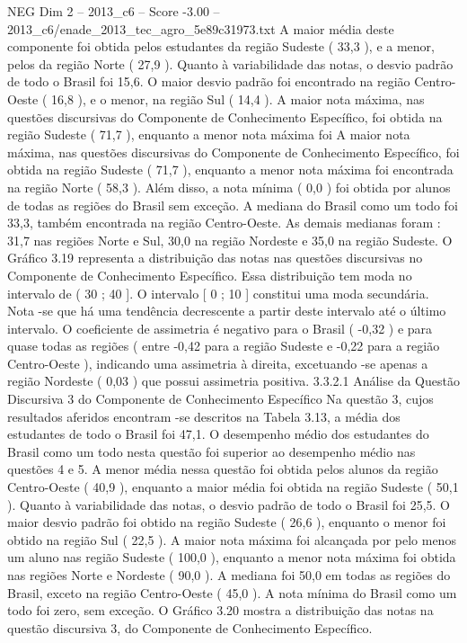 \begin{textsample}{NEG Dim 2 – 2013\_c6 – Score -3.00 – 2013\_c6/enade\_2013\_tec\_agro\_5e89c31973.txt}
A maior média deste componente foi obtida pelos estudantes da região Sudeste ( 33,3 ), e a menor, pelos da região Norte ( 27,9 ).
Quanto à variabilidade das notas, o desvio padrão de todo o Brasil foi 15,6.
O maior desvio padrão foi encontrado na região Centro-Oeste ( 16,8 ), e o menor, na região Sul ( 14,4 ).
A maior nota máxima, nas questões discursivas do Componente de Conhecimento Específico, foi obtida na região Sudeste ( 71,7 ), enquanto a menor nota máxima foi A maior nota máxima, nas questões discursivas do Componente de Conhecimento Específico, foi obtida na região Sudeste ( 71,7 ), enquanto a menor nota máxima foi encontrada na região Norte ( 58,3 ).
Além disso, a nota mínima ( 0,0 ) foi obtida por alunos de todas as regiões do Brasil sem exceção.
A mediana do Brasil como um todo foi 33,3, também encontrada na região Centro-Oeste.
As demais medianas foram : 31,7 nas regiões Norte e Sul, 30,0 na região Nordeste e 35,0 na região Sudeste.
O Gráfico 3.19 representa a distribuição das notas nas questões discursivas no Componente de Conhecimento Específico.
Essa distribuição tem moda no intervalo de ( 30 ; 40 ].
O intervalo [ 0 ; 10 ] constitui uma moda secundária.
Nota -se que há uma tendência decrescente a partir deste intervalo até o último intervalo.
O coeficiente de assimetria é negativo para o Brasil ( -0,32 ) e para quase todas as regiões ( entre -0,42 para a região Sudeste e -0,22 para a região Centro-Oeste ), indicando uma assimetria à direita, excetuando -se apenas a região Nordeste ( 0,03 ) que possui assimetria positiva. 3.3.2.1 Análise da Questão Discursiva 3 do Componente de Conhecimento Específico Na questão 3, cujos resultados aferidos encontram -se descritos na Tabela 3.13, a média dos estudantes de todo o Brasil foi 47,1.
O desempenho médio dos estudantes do Brasil como um todo nesta questão foi superior ao desempenho médio nas questões 4 e 5.
A menor média nessa questão foi obtida pelos alunos da região Centro-Oeste ( 40,9 ), enquanto a maior média foi obtida na região Sudeste ( 50,1 ).
Quanto à variabilidade das notas, o desvio padrão de todo o Brasil foi 25,5.
O maior desvio padrão foi obtido na região Sudeste ( 26,6 ), enquanto o menor foi obtido na região Sul ( 22,5 ).
A maior nota máxima foi alcançada por pelo menos um aluno nas região Sudeste ( 100,0 ), enquanto a menor nota máxima foi obtida nas regiões Norte e Nordeste ( 90,0 ).
A mediana foi 50,0 em todas as regiões do Brasil, exceto na região Centro-Oeste ( 45,0 ).
A nota mínima do Brasil como um todo foi zero, sem exceção.
O Gráfico 3.20 mostra a distribuição das notas na questão discursiva 3, do Componente de Conhecimento Específico.

\end{textsample}
